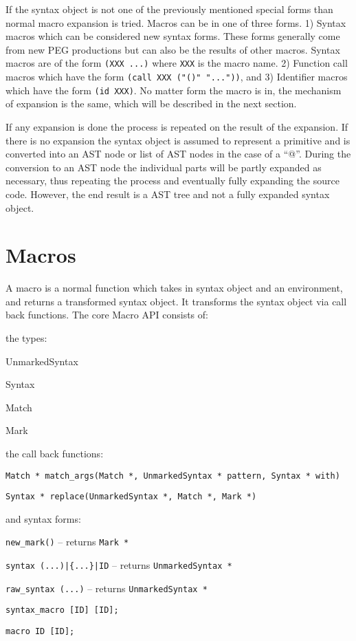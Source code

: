 \documentclass[12pt,english,letterpaper]{article}
\begin{document}
If the syntax object is not one of the previously mentioned special
forms than normal macro expansion is tried.  Macros can be in one of
three forms. 1) Syntax macros which can be considered new syntax
forms.  These forms generally come from new PEG productions but can
also be the results of other macros.  Syntax macros are of the form
\verb/(XXX ...)/ where \verb/XXX/ is the macro name.  2) Function call
macros which have the form \verb/(call XXX ("()" "..."))/, and 3)
Identifier macros which have the form \verb/(id XXX)/.  No matter form
the macro is in, the mechanism of expansion is the same, which will be
described in the next section.

If any expansion is done the process is repeated on the result of the
expansion.  If there is no expansion the syntax object is assumed to
represent a primitive and is converted into an AST node or list of AST
nodes in the case of a ``@''.  During the conversion to an AST node
the individual parts will be partly expanded as necessary, thus
repeating the process and eventually fully expanding the source code.
However, the end result is a AST tree and not a fully expanded syntax
object.

\section{Macros}

A macro is a normal function which takes in syntax object and an
environment, and returns a transformed syntax object.  It transforms the
syntax object via call back functions.  The core Macro API consists of:
\begin{itemize*}
\item the types:
\begin{itemize*}
\item UnmarkedSyntax
\item Syntax
\item Match
\item Mark
\end{itemize*}
\item the call back functions:
\begin{itemize*}
\item \verb/Match * match_args(Match *, UnmarkedSyntax * pattern, Syntax * with)/
\item \verb/Syntax * replace(UnmarkedSyntax *, Match *, Mark *)/
\end{itemize*}
\item and syntax forms:
\begin{itemize*}
\item \verb/new_mark()/ -- returns \verb/Mark */
\item \verb/syntax (...)|{...}|ID/ -- returns \verb/UnmarkedSyntax */
\item \verb/raw_syntax (...)/ -- returns \verb/UnmarkedSyntax */
\item \verb/syntax_macro [ID] [ID];/
\item \verb/macro ID [ID];/
\end{itemize*}
\end{itemize*}
\end{document}
